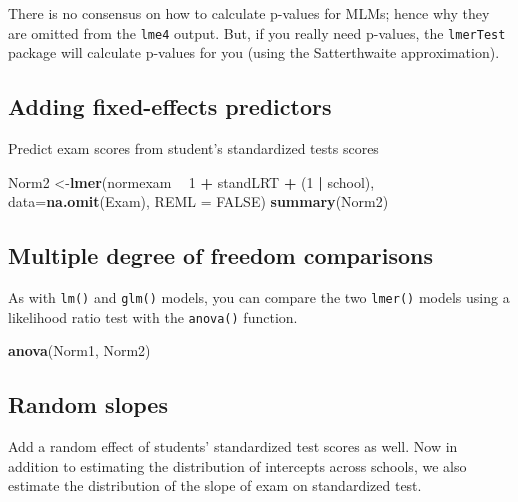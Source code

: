 \documentclass[]{book}
\newenvironment{Shaded}{\begin{snugshade}}{\end{snugshade}}
\newcommand{\DataTypeTok}[1]{\textcolor[rgb]{0.13,0.29,0.53}{#1}}
\newcommand{\DecValTok}[1]{\textcolor[rgb]{0.00,0.00,0.81}{#1}}
\newcommand{\KeywordTok}[1]{\textcolor[rgb]{0.13,0.29,0.53}{\textbf{#1}}}
\newcommand{\NormalTok}[1]{#1}
\newcommand{\OperatorTok}[1]{\textcolor[rgb]{0.81,0.36,0.00}{\textbf{#1}}}
\newcommand{\OtherTok}[1]{\textcolor[rgb]{0.56,0.35,0.01}{#1}}
\newcommand{\StringTok}[1]{\textcolor[rgb]{0.31,0.60,0.02}{#1}}
\begin{document}
There is no consensus on how to calculate p-values for MLMs; hence why they are omitted from the \texttt{lme4} output.
But, if you really need p-values, the \texttt{lmerTest} package will calculate p-values for you (using the Satterthwaite
approximation).

\hypertarget{adding-fixed-effects-predictors}{%
\subsection{Adding fixed-effects predictors}\label{adding-fixed-effects-predictors}}

Predict exam scores from student's standardized tests scores

\begin{Shaded}
\begin{Highlighting}[]
\NormalTok{  Norm2 <-}\KeywordTok{lmer}\NormalTok{(normexam }\OperatorTok{~}\StringTok{ }\DecValTok{1} \OperatorTok{+}\StringTok{ }\NormalTok{standLRT }\OperatorTok{+}\StringTok{ }\NormalTok{(}\DecValTok{1} \OperatorTok{|}\StringTok{ }\NormalTok{school),}
               \DataTypeTok{data=}\KeywordTok{na.omit}\NormalTok{(Exam), }\DataTypeTok{REML =} \OtherTok{FALSE}\NormalTok{) }
  \KeywordTok{summary}\NormalTok{(Norm2) }
\end{Highlighting}
\end{Shaded}

\hypertarget{multiple-degree-of-freedom-comparisons}{%
\subsection{Multiple degree of freedom comparisons}\label{multiple-degree-of-freedom-comparisons}}

As with \texttt{lm()} and \texttt{glm()} models, you can compare the two \texttt{lmer()} models using a likelihood ratio test with the \texttt{anova()} function.

\begin{Shaded}
\begin{Highlighting}[]
  \KeywordTok{anova}\NormalTok{(Norm1, Norm2)}
\end{Highlighting}
\end{Shaded}

\hypertarget{random-slopes}{%
\subsection{Random slopes}\label{random-slopes}}

Add a random effect of students' standardized test scores as well. Now in addition to estimating the distribution of intercepts across schools, we also estimate the distribution of the slope of exam on standardized test.
\end{document}
